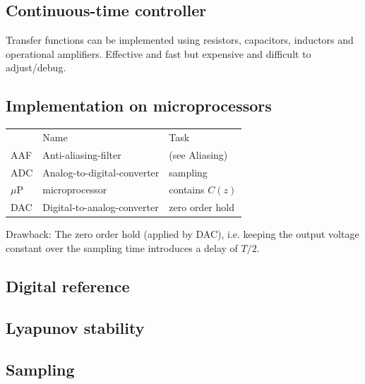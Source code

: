 \documentclass[10pt,a4paper]{scrartcl}
\begin{document}
\begin{multicols*}{3}
	\subsection*{Continuous-time controller}
	
	Transfer functions can be implemented using resistors, capacitors, inductors and operational amplifiers. Effective and fast but expensive and difficult to adjust/debug.
	
	\subsection*{Implementation on microprocessors}
	
	
	
	\small
	\begin{tabular}{lll}
	&Name&Task\\
	AAF&Anti-aliasing-filter& (see Aliasing)\\
	ADC&Analog-to-digital-converter&sampling\\
	$\mu$P&microprocessor&contains $C(z)$\\
	DAC&Digital-to-analog-converter & zero order hold
	\end{tabular}
	\normalsize
	
	
	\finn
	
	Drawback: The zero order hold (applied by DAC), i.e. keeping the output voltage constant over the sampling time introduces a delay of $T/2$.	
	
	
	\subsection*{Digital reference}
	
	
	\subsection*{Lyapunov stability}
	
	
	\subsection*{Sampling}
	

\end{multicols*}
\end{document}
